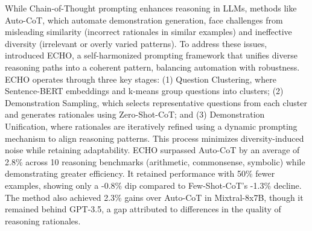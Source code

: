 \documentclass{article}
\begin{document}
\noindent While Chain-of-Thought prompting enhances reasoning in LLMs, methods like Auto-CoT, which automate demonstration generation, face challenges from misleading similarity (incorrect rationales in similar examples) and ineffective diversity (irrelevant or overly varied patterns). To address these issues,~\cite{mekala2024echopromptinstructingmodelrephrase} introduced ECHO, a self-harmonized prompting framework that unifies diverse reasoning paths into a coherent pattern, balancing automation with robustness. ECHO operates through three key stages: (1) Question Clustering, where Sentence-BERT embeddings and k-means group questions into clusters; (2) Demonstration Sampling, which selects representative questions from each cluster and generates rationales using Zero-Shot-CoT; and (3) Demonstration Unification, where rationales are iteratively refined using a dynamic prompting mechanism to align reasoning patterns. This process minimizes diversity-induced noise while retaining adaptability. ECHO surpassed Auto-CoT by an average of 2.8\% across 10 reasoning benchmarks (arithmetic, commonsense, symbolic) while demonstrating greater efficiency. It retained performance with 50\% fewer examples, showing only a -0.8\% dip compared to Few-Shot-CoT’s -1.3\% decline. The method also achieved 2.3\% gains over Auto-CoT in Mixtral-8x7B, though it remained behind GPT-3.5, a gap attributed to differences in the quality of reasoning rationales.
\end{document}
